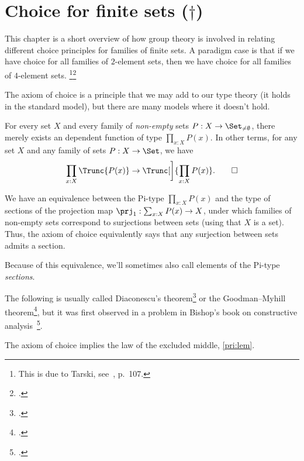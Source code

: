 \chapter{Choice for finite sets ($\dagger$)}
\label{ch:choicefin}

This chapter is a short overview of how group theory is involved in
relating different choice principles for families of finite sets.  A
paradigm case is that if we have choice for all families of
$2$-element sets, then we have choice for all families of $4$-element
sets.%
\footnote{This is due to Tarski,
  see~\citeauthor{Jech-AC}\footnotemark{}, p.~107.}\footcitetext{Jech-AC}

The axiom of choice is a principle that we may add to our type theory
(it holds in the standard model), but there are many models where it doesn't hold.

\begin{principle}\label{pri:ac}
  For every set $X$ and every family of \emph{non-empty} sets
  $P : X \to \Set_{\ne\emptyset}$,
  there merely exists an dependent function of type $\prod_{x:X}P(x)$.
  In other terms, for any set $X$ and any family of sets $P:X\to\Set$,
  we have
  \begin{equation}\label{eq:ac-impl}
    \prod_{x:X}\Trunc{P(x)} \to \Trunc[\bigg]{\prod_{x:X}P(x)}.\qedhere
  \end{equation}
\end{principle}

\begin{remark}
  We have an equivalence between the Pi-type $\prod_{x:X}P(x)$ and the
  type of sections of the projection map $\prj_1 : \sum_{x:X}P(x) \to X$,
  under which families of non-empty sets correspond to surjections between sets
  (using that $X$ is a set).
  Thus, the axiom of choice equivalently says that any surjection
  between sets admits a section.

  Because of this equivalence, we'll sometimes also call elements of the
  Pi-type \emph{sections}.
\end{remark}

The following is usually called Diaconescu's theorem\footcite{Diaconescu} or the Goodman--Myhill theorem\footcite{Goodman-Myhill}, but it was first observed in a problem in Bishop's book on constructive analysis~\footcite{Bishop}.

\begin{theorem}
  The axiom of choice implies the law of the excluded middle, \cref{pri:lem}.
\end{theorem}

